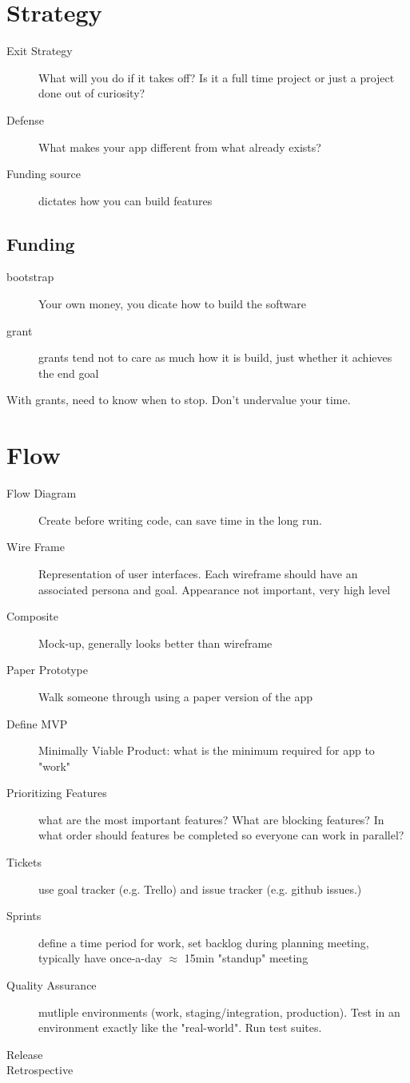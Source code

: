 \documentclass[12pt]{article}
\begin{document}
\section{Strategy}
\begin{description}
  \item [Exit Strategy] What will you do if it takes off?
    Is it a full time project or just a project done out of curiosity?
  \item [Defense] What makes your app different from what already exists?
  \item [Funding source] dictates how you can build features
\end{description}

\subsection{Funding}
\begin{description}
  \item [bootstrap] Your own money, you dicate how to build the software
  \item [grant] grants tend not to care as much how it is build, just whether
    it achieves the end goal
\end{description}
With grants, need to know when to stop. Don't undervalue your time.

\section{Flow}
\begin{description}
  \item[Flow Diagram] Create before writing code, can save time in the long run.
  \item[Wire Frame] Representation of user interfaces. Each wireframe should
    have an associated persona and goal. Appearance not important, very high
    level
  \item[Composite] Mock-up, generally looks better than wireframe
  \item[Paper Prototype] Walk someone through using a paper version of the app
  \item[Define MVP] Minimally Viable Product: what is the minimum required for
    app to "work"
  \item[Prioritizing Features] what are the most important features? What are
    blocking features? In what order should features be completed so everyone
    can work in parallel?
  \item[Tickets] use goal tracker (e.g. Trello) and issue tracker (e.g. github
    issues.)
  \item[Sprints] define a time period for work, set backlog during planning
    meeting, typically have once-a-day $\approx$ 15min "standup" meeting
  \item[Quality Assurance] mutliple environments (work, staging/integration,
    production). Test in an environment exactly like the "real-world". Run test
    suites.
  \item[Release]
  \item[Retrospective]
\end{description}
\end{document}
